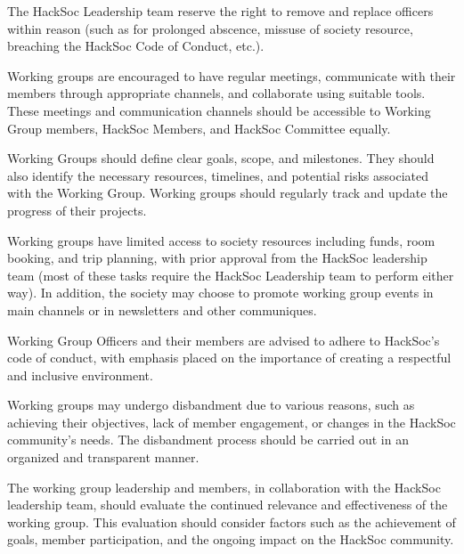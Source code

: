\begin{subclause}
    The HackSoc Leadership team reserve the right to remove and replace officers within reason (such as for prolonged abscence, missuse of society resource, breaching the HackSoc Code of Conduct, etc.).
\end{subclause}

\begin{subclause}
Working groups are encouraged to have regular meetings, communicate with their members through appropriate channels, and collaborate using suitable tools. These meetings and communication channels should be accessible to Working Group members, HackSoc Members, and HackSoc Committee equally.
\end{subclause}

\begin{subclause}
Working Groups should define clear goals, scope, and milestones. They should also identify the necessary resources, timelines, and potential risks associated with the Working Group. Working groups should regularly track and update the progress of their projects.
\end{subclause}

\begin{subclause}
Working groups have limited access to society resources including funds, room booking, and trip planning, with prior approval from the HackSoc leadership team (most of these tasks require the HackSoc Leadership team to perform either way). In addition, the society may choose to promote working group events in main channels or in newsletters and other communiques.
\end{subclause}

\begin{subclause}
Working Group Officers and their members are advised to adhere to HackSoc's code of conduct, with emphasis placed on the importance of creating a respectful and inclusive environment.
\end{subclause}

\begin{clause}
Working groups may undergo disbandment due to various reasons, such as achieving their objectives, lack of member engagement, or changes in the HackSoc community's needs. The disbandment process should be carried out in an organized and transparent manner.
\end{clause}

\begin{subclause}
The working group leadership and members, in collaboration with the HackSoc leadership team, should evaluate the continued relevance and effectiveness of the working group. This evaluation should consider factors such as the achievement of goals, member participation, and the ongoing impact on the HackSoc community.
\end{subclause}

